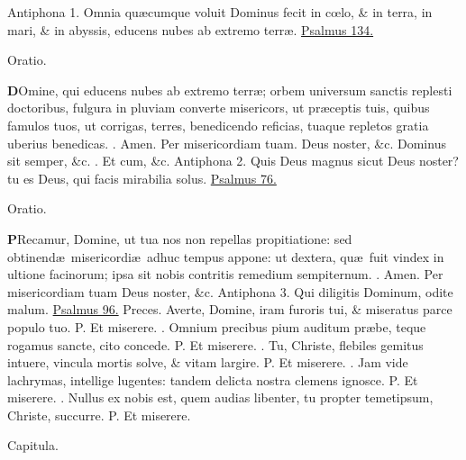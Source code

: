 \documentclass[letter,11pt]{book}
\makeatletter
\DeclareRobustCommand{\Vbar}{\vers@resp{-0.1em}{V}}
\DeclareRobustCommand{\Rbar}{\vers@resp{0pt}{R}}
\newcommand{\vers@resp@sym}{\raisebox{0.2ex}{\rotatebox[origin=c]{-20}{$\m@th\rceil$}}}
\newcommand{\vers@resp}[2]{%
  {\ooalign{\hidewidth\kern#1\vers@resp@sym\hidewidth\cr#2\cr}}%
}%
\def\P{\color{Red} P. \color{black}}
\def\V{\color{Red} \Vbar . \color{black}}
\def\R{\color{Red} \Rbar . \color{black}}
\makeatother
\begin{document}
\begin{multicols*}{2}
\newline \color{Red} Antiphona 1. \color{black} Omnia qu\ae cumque voluit Dominus fecit in c\oe lo, \& in terra, in mari, \& in abyssis, educens nubes ab extremo terr\ae . \color{Red} \hyperlink{ps134}{Psalmus 134.} \color{black}
\vspace{-.5em} \begin{center} \color{Red} Oratio. \color{black} \end{center} \vspace{-.5em}
\lettrine[lines=2]{\bfseries \color{Red} D}{}Omine, qui educens nubes ab extremo terr\ae ; orbem universum sanctis replesti doctoribus, fulgura in pluviam converte misericors, ut pr\ae ceptis tuis, quibus famulos tuos, ut corrigas, terres, benedicendo reficias, tuaque repletos gratia uberius benedicas. \R Amen. Per misericordiam tuam. Deus noster, \&c. Dominus sit semper, \&c. \R Et cum, \&c.
\newline \color{Red} Antiphona 2. \color{black} Quis Deus magnus sicut Deus noster? tu es Deus, qui facis mirabilia solus. \color{Red} \hyperlink{ps76}{Psalmus 76.} \color{black}
\vspace{-.5em} \begin{center} \color{Red} Oratio. \color{black} \end{center} \vspace{-.5em}
\lettrine[lines=2]{\bfseries \color{Red} P}{}Recamur, Domine, ut tua nos non repellas propitiatione: sed obtinend\ae \ misericordi\ae \ adhuc tempus appone: ut dextera, qu\ae \ fuit vindex in ultione facinorum; ipsa sit nobis contritis remedium sempiternum. \R Amen. Per misericordiam tuam Deus noster, \&c.
\newline \color{Red} Antiphona 3. \color{black} Qui diligitis Dominum, odite malum. \color{Red} \hyperlink{ps96}{Psalmus 96.} \color{black}
\newline \color{Red} Preces. \color{black} Averte, Domine, iram furoris tui, \& miseratus parce populo tuo. \P Et miserere. \V Omnium precibus pium auditum pr\ae be, teque rogamus sancte, cito concede. \P Et miserere. \V Tu, Christe, flebiles gemitus intuere, vincula mortis solve, \& vitam largire. \P Et miserere. \V Jam vide lachrymas, intellige lugentes: tandem delicta nostra clemens ignosce. \P Et miserere. \V Nullus ex nobis est, quem audias libenter, tu propter temetipsum, Christe, succurre. \P Et miserere.
\vspace{-.5em} \begin{center} \color{Red} Capitula. \color{black} \end{center} \vspace{-.5em}

\end{multicols*}
\end{document}
